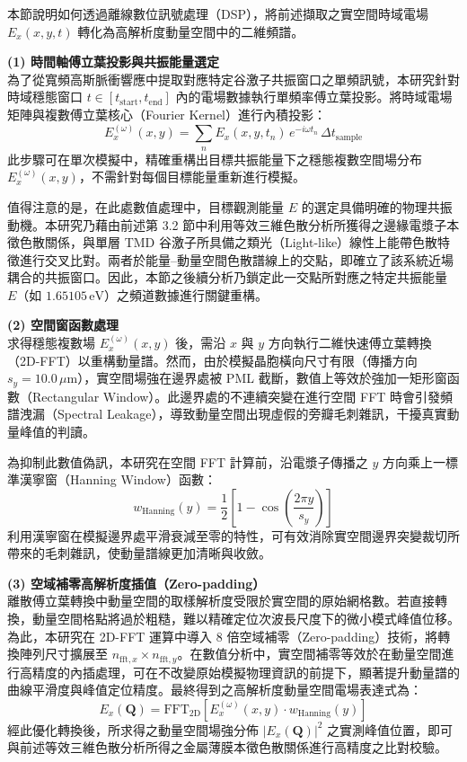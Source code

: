 本節說明如何透過離線數位訊號處理（DSP），將前述擷取之實空間時域電場 $E_x(x,y,t)$ 轉化為高解析度動量空間中的二維頻譜。

\noindent\textbf{(1) 時間軸傅立葉投影與共振能量選定} \\
為了從寬頻高斯脈衝響應中提取對應特定谷激子共振窗口之單頻訊號，本研究針對時域穩態窗口 $t \in [t_\mathrm{start}, t_\mathrm{end}]$ 內的電場數據執行單頻率傅立葉投影。將時域電場矩陣與複數傅立葉核心（Fourier Kernel）進行內積投影：
\begin{equation}
	E_{x}^{(\omega)}(x,y) = \sum_{n} E_{x}(x,y,t_n)\,e^{-i\omega t_n}\,\Delta t_\mathrm{sample}
	\label{eq:time_dft_324}
\end{equation}
此步驟可在單次模擬中，精確重構出目標共振能量下之穩態複數空間場分布 $E_{x}^{(\omega)}(x,y)$，不需針對每個目標能量重新進行模擬。

值得注意的是，在此處數值處理中，目標觀測能量 $E$ 的選定具備明確的物理共振動機。本研究乃藉由前述第 3.2 節中利用等效三維色散分析所獲得之邊緣電漿子本徵色散關係，與單層 TMD 谷激子所具備之類光（Light-like）線性上能帶色散特徵進行交叉比對。兩者於能量--動量空間色散譜線上的交點，即確立了該系統近場耦合的共振窗口。因此，本節之後續分析乃鎖定此一交點所對應之特定共振能量 $E$（如 $1.65105\,\mathrm{eV}$）之頻道數據進行關鍵重構。

\vspace{0.3cm}
\noindent\textbf{(2) 空間窗函數處理} \\
求得穩態複數場 $E_{x}^{(\omega)}(x,y)$ 後，需沿 $x$ 與 $y$ 方向執行二維快速傅立葉轉換（2D-FFT）以重構動量譜。然而，由於模擬晶胞橫向尺寸有限（傳播方向 $s_y = 10.0\,\mu\mathrm{m}$），實空間場強在邊界處被 PML 截斷，數值上等效於強加一矩形窗函數（Rectangular Window）。此邊界處的不連續突變在進行空間 FFT 時會引發頻譜洩漏（Spectral Leakage），導致動量空間出現虛假的旁瓣毛刺雜訊，干擾真實動量峰值的判讀。

為抑制此數值偽訊，本研究在空間 FFT 計算前，沿電漿子傳播之 $y$ 方向乘上一標準漢寧窗（Hanning Window）函數：
\begin{equation}
	w_{\mathrm{Hanning}}(y) = \frac{1}{2}\left[1 - \cos\left(\frac{2\pi y}{s_y}\right)\right]
\end{equation}
利用漢寧窗在模擬邊界處平滑衰減至零的特性，可有效消除實空間邊界突變裁切所帶來的毛刺雜訊，使動量譜線更加清晰與收斂。

\vspace{0.3cm}
\noindent\textbf{(3) 空域補零高解析度插值（Zero-padding）} \\
離散傅立葉轉換中動量空間的取樣解析度受限於實空間的原始網格數。若直接轉換，動量空間格點將過於粗糙，難以精確定位次波長尺度下的微小模式峰值位移。為此，本研究在 2D-FFT 運算中導入 8 倍空域補零（Zero-padding）技術，將轉換陣列尺寸擴展至 $n_{\mathrm{fft},x} \times n_{\mathrm{fft},y}$。在數值分析中，實空間補零等效於在動量空間進行高精度的內插處理，可在不改變原始模擬物理資訊的前提下，顯著提升動量譜的曲線平滑度與峰值定位精度。最終得到之高解析度動量空間電場表達式為：
\begin{equation}
	E_{x}(\mathbf{Q}) = \mathrm{FFT}_{\mathrm{2D}}\left[E_{x}^{(\omega)}(x,y)\cdot w_{\mathrm{Hanning}}(y)\right]
	\label{eq:space_fft_324}
\end{equation}
經此優化轉換後，所求得之動量空間場強分佈 $|E_x(\mathbf{Q})|^2$ 之實測峰值位置，即可與前述等效三維色散分析所得之金屬薄膜本徵色散關係進行高精度之比對校驗。